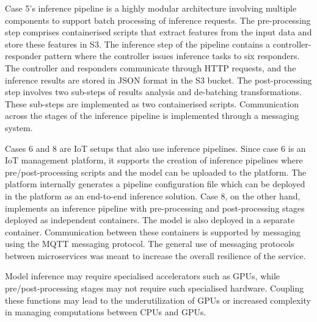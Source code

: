Case 5's inference pipeline is a highly modular architecture involving multiple components to support batch processing of inference requests. The pre-processing step comprises containerised scripts that extract features from the input data and store these features in S3. The inference step of the pipeline contains a controller-responder pattern where the controller issues inference tasks to six responders.  The controller and responders communicate through HTTP requests, and the inference results are stored in JSON format in the S3 bucket. The post-processing step involves two sub-steps of results analysis and de-batching transformations. These sub-steps are implemented as two containerised scripts. Communication across the stages of the inference pipeline is implemented through a messaging system.

Cases 6 and 8 are IoT setups that also use inference pipelines. Since case 6 is an IoT management platform, it supports the creation of inference pipelines where pre/post-processing scripts and the model can be uploaded to the platform. The platform internally generates a pipeline configuration file which can be deployed in the platform as an end-to-end inference solution. Case 8, on the other hand, implements an inference pipeline with pre-processing and post-processing stages deployed as independent containers. The model is also deployed in a separate container. Communication between these containers is supported by messaging using the MQTT messaging protocol. The general use of messaging protocols between microservices was meant to increase the overall resilience of the service.

Model inference may require specialised accelerators such as GPUs, while pre/post-processing stages may not require such specialised hardware. Coupling these functions may lead to the underutilization of GPUs or increased complexity in managing computations between CPUs and GPUs.




